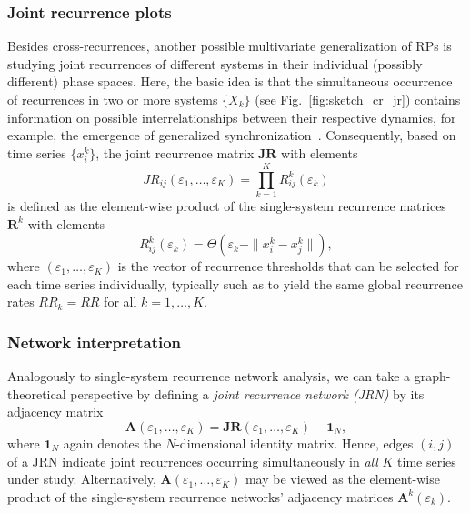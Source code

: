 		\subsubsection{Joint recurrence plots}

Besides cross-recurrences, another possible multivariate generalization of RPs is studying joint recurrences of different systems in their individual (possibly different) phase spaces. Here, the basic idea is that the simultaneous occurrence of recurrences in two or more systems $\{X_k\}$ (see Fig.~\ref{fig:sketch_cr_jr}) contains information on possible interrelationships between their respective dynamics, for example, the emergence of generalized synchronization~\cite{Romano2004PLA,Romano2005EPL}. Consequently, based on time series $\{x_i^k\}$, the joint recurrence matrix $\mathbf{JR}$ with elements
\begin{equation}
JR_{ij}(\varepsilon_1,\dots,\varepsilon_K)=\prod_{k=1}^K R_{ij}^k(\varepsilon_k)
\end{equation}
is defined as the element-wise product of the single-system recurrence matrices $\mathbf{R}^k$ with elements
\begin{equation}
R_{ij}^k(\varepsilon_k)=\Theta(\varepsilon_k - \|x_i^k - x_j^k\|), 
\end{equation}
where $(\varepsilon_1,\dots,\varepsilon_K)$ is the vector of recurrence thresholds that can be selected for each time series individually, typically such as to yield the same global recurrence rates $RR_k=RR$ for all $k=1,\dots,K$.


\subsubsection{Network interpretation}

Analogously to single-system recurrence network analysis, we can take a graph-theoretical perspective by defining a \emph{joint recurrence network (JRN)} by its adjacency matrix
\begin{equation}
\mathbf{A}(\varepsilon_1,\dots,\varepsilon_K) = \mathbf{JR}(\varepsilon_1,\dots,\varepsilon_K) - \mathbf{1}_N,
\end{equation}
where $\mathbf{1}_N$ again denotes the $N$-dimensional identity matrix. Hence, edges $(i,j)$ of a JRN indicate joint recurrences occurring simultaneously in \emph{all} $K$ time series under study. Alternatively, $\mathbf{A}(\varepsilon_1,\dots,\varepsilon_K)$ may be viewed as the element-wise product of the single-system recurrence networks' adjacency matrices $\mathbf{A}^k(\varepsilon_k)$.

